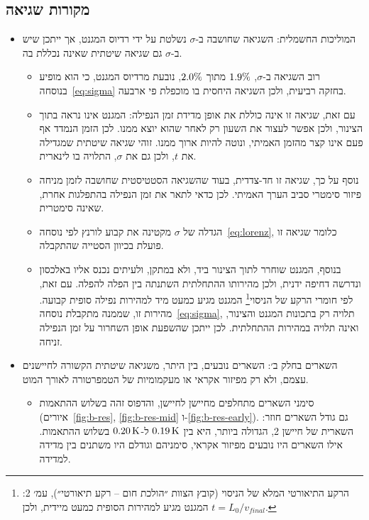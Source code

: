 \documentclass[10pt,a4paper]{article}
\newcommand{\U}[1]{\,\mathrm{#1}}
\begin{document}
\subsection*{מקורות שגיאה}
\begin{itemize}\setlength{\itemsep}{2pt}\setlength{\parskip}{0pt}
  \item המוליכות החשמלית: השגיאה שחושבה ב-$\sigma$ נשלטת על ידי רדיוס המגנט, אך ייתכן שיש ב-$\sigma$ גם שגיאה שיטתית שאינה נכללת בה.
  \begin{itemize}\setlength{\itemsep}{0pt}\setlength{\parskip}{0pt}
    \item רוב השגיאה ב-$\sigma$, $1.9\%$ מתוך $2.0\%$, נובעת מרדיוס המגנט, כי הוא מופיע בנוסחה~\eqref{eq:sigma} בחזקה רביעית, ולכן השגיאה היחסית בו מוכפלת פי ארבעה.
    \item עם זאת, שגיאה זו אינה כוללת את אופן מדידת זמן הנפילה: המגנט אינו נראה בתוך הצינור, ולכן אפשר לעצור את השעון רק לאחר שהוא יוצא ממנו. לכן הזמן הנמדד אף פעם אינו קצר מהזמן האמיתי, ונוטה להיות ארוך ממנו. זוהי שגיאה שיטתית שמגדילה את $t$, ולכן גם את $\sigma$, התלויה בו לינארית.
    \item נוסף על כך, שגיאה זו חד-צדדית, בעוד שהשגיאה הסטטיסטית שחושבה לזמן מניחה פיזור סימטרי סביב הערך האמיתי. לכן כדאי לתאר את זמן הנפילה בהתפלגות אחרת, שאינה סימטרית.
    \item הגדלה של $\sigma$ מקטינה את קבוע לורנץ לפי נוסחה~\eqref{eq:lorenz}, כלומר שגיאה זו פועלת בכיוון הסטייה שהתקבלה.
    \item בנוסף, המגנט שוחרר לתוך הצינור ביד, ולא במתקן, ולעיתים נכנס אליו באלכסון ונדרשה דחיפה ידנית, ולכן מהירותו ההתחלתית השתנתה בין הפלה להפלה. עם זאת, לפי חומרי הרקע של הניסוי\footnote{הרקע התיאורטי המלא של הניסוי (קובץ הצוות ״הולכת חום -- רקע תיאורטי״), עמ׳ 2: המגנט מגיע למהירות הסופית כמעט מיידית, ולכן $t = L_0/v_{final}$.} המגנט מגיע כמעט מיד למהירות נפילה סופית קבועה. מהירות זו, שממנה מתקבלת נוסחה~\eqref{eq:sigma}, תלויה רק בתכונות המגנט והצינור, ואינה תלויה במהירות ההתחלתית. לכן ייתכן שהשפעת אופן השחרור על זמן הנפילה זניחה.
  \end{itemize}
  \item השארים בחלק ב׳: השארים נובעים, בין היתר, משגיאה שיטתית הקשורה לחיישנים עצמם, ולא רק מפיזור אקראי או מעקמומיות של הטמפרטורה לאורך המוט.
  \begin{itemize}\setlength{\itemsep}{0pt}\setlength{\parskip}{0pt}
    \item סימני השארים מתחלפים מחיישן לחיישן, והדפוס זהה בשלוש ההתאמות (איורים~\ref{fig:b-res}, \ref{fig:b-res-mid} ו-\ref{fig:b-res-early}). גם גודל השארים חוזר: השארית של חיישן 2, הגדולה ביותר, היא בין $\DResTwoMin\U{K}$ ל-$\DResTwoMax\U{K}$ בשלוש ההתאמות. אילו השארים היו נובעים מפיזור אקראי, סימניהם וגודלם היו משתנים בין מדידה למדידה.

\end{itemize}
\end{itemize}
\end{document}

